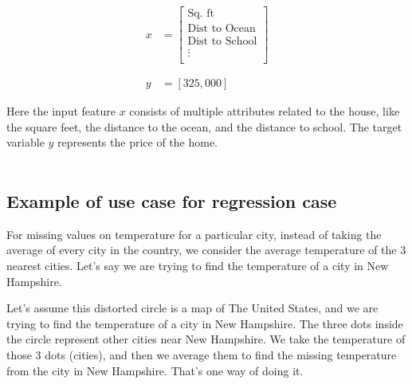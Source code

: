 \vspace{-0.5cm}

\begin{align*}
    x &= \begin{bmatrix}
            \text{Sq. ft} \\
            \text{Dist to Ocean} \\
            \text{Dist to School} \\
            \vdots \\
         \end{bmatrix} \\\\\\
    y &= [325,000]
\end{align*}

Here the input feature $x$ consists of multiple attributes related to the house,
like the  square feet, the distance to the ocean, and the distance to school. The target
variable $y$ represents the price of the home.\\\\

\subsection{Example of use case for regression case}

For missing values on temperature for a particular city, instead of
taking the average of every city in the country, we consider the average
temperature of the 3 nearest cities. Let's say we are trying to find the temperature
of a city in New Hampshire.

\begin{center}
\end{center}

Let's assume this distorted circle is a map of The United States, and we are trying
to find the temperature of a city in New Hampshire. The three dots inside the circle
represent other cities near New Hampshire. We take the temperature of those 3 dots (cities),
and then we average them to find the missing temperature from the city in New Hampshire. That's one
way of doing it.

